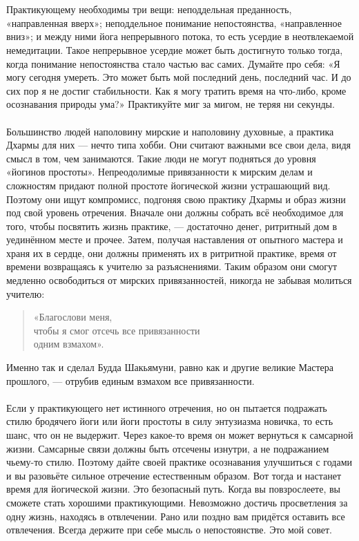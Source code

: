 \\ \\ Практикующему необходимы три вещи: неподдельная преданность, «направленная вверх»; неподдельное понимание непостоянства, «направленное вниз»; и между ними йога непрерывного потока, то есть усердие в неотвлекаемой немедитации. Такое непрерывное усердие может быть достигнуто только тогда, когда понимание непостоянства стало частью вас самих. Думайте про себя: «Я могу сегодня умереть. Это может быть мой последний день, последний час. И до сих пор я не достиг стабильности. Как я могу тратить время на что-либо, кроме осознавания природы ума?» Практикуйте миг за мигом, не теряя ни секунды.
\\ \\ Большинство людей наполовину мирские и наполовину духовные, а практика Дхармы для них — нечто типа хобби. Они считают важными все свои дела, видя смысл в том, чем занимаются. Такие люди не могут подняться до уровня «йогинов простоты». Непреодолимые привязанности к мирс\-ким делам и сложностям придают полной простоте йогической жизни устрашающий вид. Поэтому они ищут компромисс, подгоняя свою практику Дхармы и образ жизни под свой уровень отречения. Вначале они должны собрать всё необходимое для того, чтобы посвятить жизнь практике, — достаточно денег, ритритный дом в уединённом месте и прочее. Затем, получая наставления от опытного мастера и храня их в сердце, они должны применять их в ритритной практике, время от времени возвращаясь к учителю за разъяснениями. Таким образом они смогут медленно освободиться от мирских привязанностей, никогда не забывая молиться учителю:
\begin{verse}
«Благослови меня,
  \\ \indent чтобы я смог отсечь все привязанности 
        \\ \indent \indent одним взмахом».
\end{verse}
\newpage
Именно так и сделал Будда Шакьямуни, равно как и другие великие Мастера прошлого, — отрубив единым взмахом все привязанности.
\\ \\ Если у практикующего нет истинного отречения, но он пытается подражать стилю бродячего йоги или йоги простоты в силу энтузиазма новичка, то есть шанс, что он не выдержит. Через какое-то время он может вернуться к самсарной жизни. Самсарные связи должны быть отсечены изнутри, а не подражанием чьему-то стилю. Поэтому дайте своей практике осознавания улучшиться с годами и вы разовьёте сильное отречение естественным образом. Вот тогда и настанет время для йогической жизни. Это безопасный путь. Когда вы повзрослеете, вы сможете стать хорошими практикующими. Невозможно достичь просветления за одну жизнь, находясь в отвлечении. Рано или поздно вам придётся оставить все отвлечения. Всегда держите при себе мысль о непостоянстве. Это мой совет.
